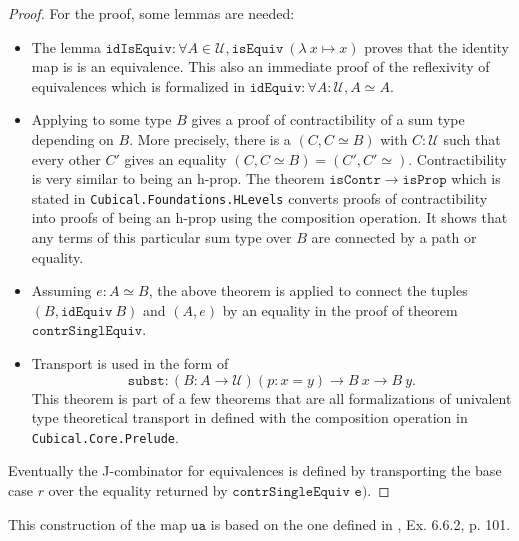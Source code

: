 \documentclass[12pt,a4paper,twoside,xetex]{book} %
\newcommand{\op}[1]{\mathtt{#1}}
\newcommand{\type}{\mathcal{U}}
\begin{document}
\begin{proof}

For the proof, some lemmas are needed: 
\begin{itemize}

\item The lemma $\op{idIsEquiv}: \forall A \in \type , \op{isEquiv} \  
(\lambda \ x \mapsto x)$ proves that the identity map is is an equivalence. This also an immediate proof of the reflexivity of equivalences which is formalized in  $\op{idEquiv}: \forall A : \type, A 
\simeq A$.

\item Applying  to some type $B$ gives a proof of 
contractibility of a sum type depending on $B$. More precisely, there is a $(C, 
C \simeq B)$ with $C:\mathcal{U}$ such that every other $C'$ gives an equality 
$(C,C \simeq B) = (C',C'\simeq)$. Contractibility is very similar to being an 
h-prop. The theorem $\op{isContr} \rightarrow \op{isProp}$ which is stated in 
\texttt{Cubical.Foundations.HLevels} converts proofs of contractibility into 
proofs of being an h-prop using the composition operation. It shows that any 
terms of this particular sum type over $B$ are connected by a path or equality.


\item   Assuming $e : A \simeq B$, the above theorem is applied to connect the 
tuples $(B, \op{idEquiv} \ B)$ and $(A, e)$ by an equality in the proof of 
theorem $\op{contrSinglEquiv}$.

\item Transport is used in the form of $$\op{subst} : \left(B : A \rightarrow \type 
\right) (p : x = y) \rightarrow B \ x \rightarrow B \ y.$$ This theorem is part 
of a few theorems that are all formalizations of univalent type theoretical 
transport in defined with the composition operation in 
\texttt{Cubical.Core.Prelude}.

\end{itemize}

Eventually the J-combinator for equivalences is defined by transporting the 
base case $r$ over the equality returned by $\texttt{contrSingleEquiv e)}$.

\end{proof}

This construction of the map $\op{ua}$ is based on the one defined in 
\cite{Huber2016}, Ex. 6.6.2, p. 101.
\end{document}
